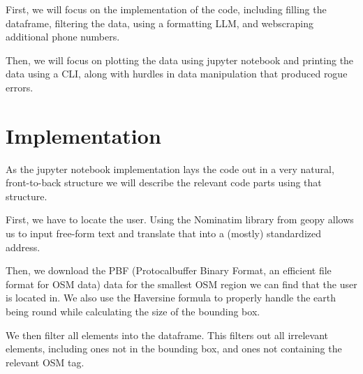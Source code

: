 \documentclass[runningheads]{llncs}
\begin{document}
First, we will focus on the implementation of the code, including filling the dataframe, filtering the data, using a formatting LLM, and webscraping additional phone numbers.

Then, we will focus on plotting the data using jupyter notebook and printing the data using a CLI, along with hurdles in data manipulation that produced rogue errors.

\section{Implementation}
As the jupyter notebook implementation lays the code out in a very natural, front-to-back structure we will describe the relevant code parts using that structure.

First, we have to locate the user. Using the Nominatim library from geopy allows us to input free-form text and translate that into a (mostly) standardized address.

Then, we download the PBF (Protocalbuffer Binary Format, an efficient file format for OSM data) data for the smallest OSM region we can find that the user is located in. We also use the Haversine formula to properly handle the earth being round while calculating the size of the bounding box.

We then filter all elements into the dataframe. This filters out all irrelevant elements, including ones not in the bounding box, and ones not containing the relevant OSM tag. 
\end{document}
